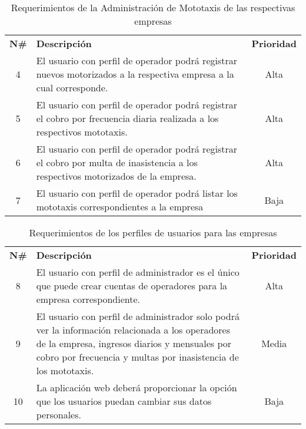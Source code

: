 \begin{table}[H]
	\centering
    \begin{tabular}{ |c|p{10cm}|c| }
	  \hline
	  \rowcolor{indigo-dark} \multicolumn{3}{|c|}{ \textcolor{white}{\textbf{Administración de Mototaxis}}} \\
	  \hline
	  \rowcolor{indigo-light} \textbf{N\#} & \centering \textbf{Descripción} & \textbf{Prioridad} \\
	  \hline
	  4 & El usuario con perfil de operador podrá registrar nuevos motorizados a la respectiva empresa a la cual corresponde. & Alta \\
	  \hline
	  5 & El usuario con perfil de operador podrá registrar el cobro por frecuencia diaria realizada a los respectivos mototaxis. & Alta \\
	  \hline
	  6 & El usuario con perfil de operador podrá registrar el cobro por multa de inasistencia a los respectivos motorizados de la empresa. & Alta \\
	  \hline
	  7 & El usuario con perfil de operador podrá listar los mototaxis correspondientes a la empresa & Baja \\
	  \hline
	\end{tabular}
	\caption{Requerimientos de la Administración de Mototaxis de las respectivas empresas}
\end{table}

\begin{table}[H]
	\centering
    \begin{tabular}{ |c|p{10cm}|c| }
	  \hline
	  \rowcolor{indigo-dark} \multicolumn{3}{|c|}{ \textcolor{white}{\textbf{Administración de Usuarios}}} \\
	  \hline
	  \rowcolor{indigo-light} \textbf{N\#} & \centering \textbf{Descripción} & \textbf{Prioridad} \\
	  \hline
	  8 & El usuario con perfil de administrador es el único que puede crear cuentas de operadores para la empresa correspondiente. & Alta\\
	  \hline
	  9 & El usuario con perfil de administrador solo podrá ver la información relacionada a los operadores de la empresa, ingresos diarios y mensuales por cobro por frecuencia y multas por inasistencia de los mototaxis. & Media \\
	  \hline
	  10 & La aplicación web deberá proporcionar la opción que los usuarios puedan  cambiar sus datos personales. & Baja \\
	  \hline
	\end{tabular}
	\caption{Requerimientos de los perfiles de usuarios para las empresas}
\end{table}

